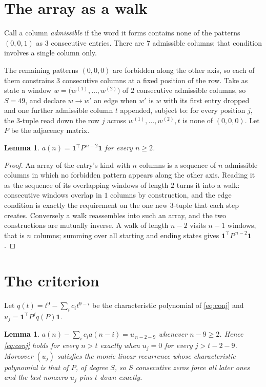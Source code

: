 \documentclass[11pt,a4paper]{article}
\theoremstyle{plain}
\newtheorem{lemma}[theorem]{Lemma}
\theoremstyle{definition}
\begin{document}
\section{The array as a walk}

Call a column \emph{admissible} if the word it forms contains none of the patterns
$(0,0,1)$ as $3$ consecutive entries. There are $7$ admissible columns; that condition
involves a single column only.

The remaining patterns $(0,0,0)$ are forbidden along the other axis, so each of them
constrains $3$ consecutive columns at a fixed position of the row. Take as state a
window $w=\bigl(w^{(1)},\dots,w^{(2)}\bigr)$ of $2$ consecutive admissible
columns, so $S=49$, and declare $w\to w'$ an edge when $w'$ is $w$ with its first entry
dropped and one further admissible column $t$ appended, subject to: for every position
$j$, the $3$-tuple read down the row $j$ across $w^{(1)},\dots,w^{(2)},t$
is none of $(0,0,0)$. Let $P$ be the adjacency matrix.

\begin{lemma}\label{lem:walk}
$a(n)=\mathbf{1}^{\!\top}P^{\,n-2}\mathbf{1}$ for every $n\ge2$.
\end{lemma}

\begin{proof}
An array of the entry's kind with $n$ columns is a sequence of $n$ admissible columns in
which no forbidden pattern appears along the other axis. Reading it as the sequence of its
overlapping windows of length $2$ turns it into a walk: consecutive windows overlap in
$1$ columns by construction, and the edge condition is exactly the requirement on the one
new $3$-tuple that each step creates. Conversely a walk reassembles into such an array,
and the two constructions are mutually inverse. A walk of length $n-2$ visits $n-1$
windows, that is $n$ columns; summing over all starting and ending states gives
$\mathbf{1}^{\!\top}P^{\,n-2}\mathbf{1}$.
\end{proof}

\section{The criterion}

Let $q(t)=t^{9}-\sum_i c_i t^{9-i}$ be the characteristic polynomial of
\eqref{eq:conj} and $u_j=\mathbf{1}^{\!\top}P^{j}q(P)\mathbf{1}$.

\begin{lemma}\label{lem:crit}
$a(n)-\sum_i c_i a(n-i)=u_{\,n-2-9}$ whenever $n-9\ge2$. Hence
\eqref{eq:conj} holds for every $n>t$ exactly when $u_j=0$ for every
$j>t-2-9$. Moreover $(u_j)$ satisfies the monic linear recurrence whose
characteristic polynomial is that of $P$, of degree $S$, so $S$ consecutive zeros force all
later ones and the last nonzero $u_j$ pins $t$ down exactly.
\end{lemma}
\end{document}
